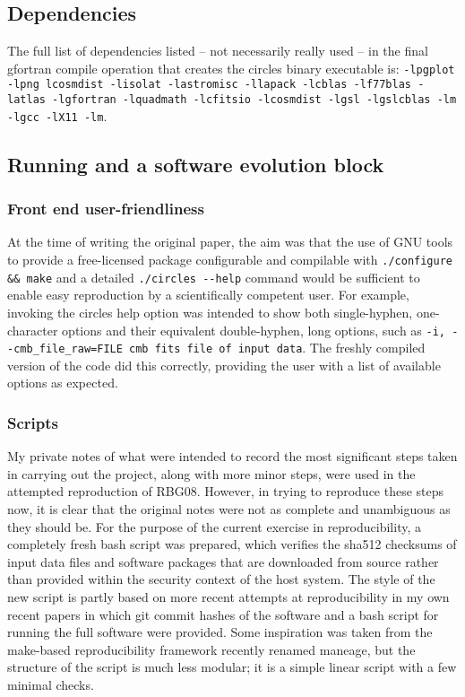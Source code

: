 \subsection{Dependencies}

The full list of dependencies listed -- not necessarily really used -- in
the final {\sc gfortran} compile operation that creates the {\sc circles}
binary executable is:
{\tt \mbox{\tt -lpgplot} -lpng lcosmdist -lisolat -lastromisc -llapack -lcblas
-lf77blas -latlas -lgfortran -lquadmath -lcfitsio -lcosmdist -lgsl
-lgslcblas -lm -lgcc -lX11 -lm}. \sloppy

\subsection{Running and a software evolution block} \label{s-running}

\subsubsection{Front end user-friendliness}

At the time of writing the original paper, the aim was that the use of GNU
tools to provide a free-licensed package configurable and compilable
with {\tt ./configure \&\& make} and a detailed {\tt ./circles
  -{}-help} command would be sufficient to enable easy reproduction by
a scientifically competent user. For example, invoking the {\sc
  circles} help option was intended to show both single-hyphen, one-character options
and their equivalent double-hyphen, long options, such as
\mbox{{\tt -i,  -{}-cmb\_file\_raw=FILE cmb fits file of input data}}.
The freshly compiled version of the code did this correctly, providing the
user with a list of available options as expected.
\sloppy

\subsubsection{Scripts}

\fussy
My private notes of what were intended to record the most significant steps
taken in carrying out the project, along with more minor steps, were
used in the attempted reproduction of RBG08.  However, in trying to
reproduce these steps now, it is clear that the original notes were
not as complete and unambiguous as they should be.  For the purpose of
the current exercise in reproducibility, a completely fresh {\sc bash}
script was prepared, which verifies the sha512 checksums of input data
files and software packages that are downloaded from source rather
than provided within the security context of the host system. The
style of the new script is partly based on more recent attempts at
reproducibility in my own recent papers in which {\sc git} commit
hashes of the software\supercite{Roukema17silvir} and a {\sc bash}
script for running the full software\supercite{RO19flatness} were
provided. Some inspiration was taken from the {\sc make}-based reproducibility
framework\supercite{Akhlaghi15} recently renamed
{\sc maneage}\supercite{Akhlaghi2020}, but the structure of the
script is much less modular; it is a simple linear script with a
few minimal checks.

